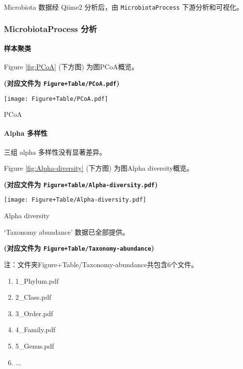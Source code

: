 \documentclass[
]{article}
\providecommand{\tightlist}{%
  \setlength{\itemsep}{0pt}\setlength{\parskip}{0pt}}
\begin{document}
Microbiota 数据经 Qiime2 分析后，由 \texttt{MicrobiotaProcess} 下游分析和可视化。

\hypertarget{microbiotaprocess-ux5206ux6790}{%
\subsubsection{MicrobiotaProcess 分析}\label{microbiotaprocess-ux5206ux6790}}

\hypertarget{ux6837ux672cux805aux7c7b}{%
\paragraph{样本聚类}\label{ux6837ux672cux805aux7c7b}}

Figure \ref{fig:PCoA} (下方图) 为图PCoA概览。

\textbf{(对应文件为 \texttt{Figure+Table/PCoA.pdf})}

\def\@captype{figure}
\begin{center}
\texttt{[image: Figure+Table/PCoA.pdf]}
\caption{PCoA}\label{fig:PCoA}
\end{center}

\hypertarget{alpha}{%
\paragraph{Alpha 多样性}\label{alpha}}

三组 alpha 多样性没有显著差异。

Figure \ref{fig:Alpha-diversity} (下方图) 为图Alpha diversity概览。

\textbf{(对应文件为 \texttt{Figure+Table/Alpha-diversity.pdf})}

\def\@captype{figure}
\begin{center}
\texttt{[image: Figure+Table/Alpha-diversity.pdf]}
\caption{Alpha diversity}\label{fig:Alpha-diversity}
\end{center}

`Taxonomy abundance' 数据已全部提供。

\textbf{(对应文件为 \texttt{Figure+Table/Taxonomy-abundance})}

\begin{center}\begin{tcolorbox}[colback=gray!10, colframe=gray!50, width=0.9\linewidth, arc=1mm, boxrule=0.5pt]注：文件夹Figure+Table/Taxonomy-abundance共包含6个文件。

\begin{enumerate}\tightlist
\item 1\_Phylum.pdf
\item 2\_Class.pdf
\item 3\_Order.pdf
\item 4\_Family.pdf
\item 5\_Genus.pdf
\item ...
\end{enumerate}\end{tcolorbox}
\end{center}
\end{document}
